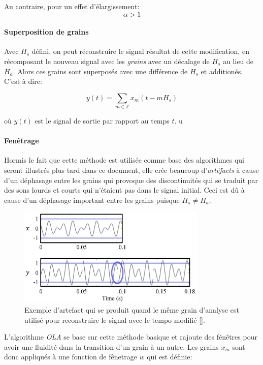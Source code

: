 \documentclass[letterpaper]{article}
\begin{document}
Au contraire, pour un effet d'élargissement:
$$\alpha > 1$$

\paragraph{Superposition de grains}

Avec $H_{s}$ défini, on peut réconstruire le signal résultat de cette modification, en récomposant
le nouveau signal avec les \emph{grains} avec un décalage de $H_{s}$ au lieu de $H_{a}$. Alors ces
grains sont superposés avec une différence de $H_{s}$ et additionés. C'est à dire:

$$ y(t) = \sum_{m \in \mathbb{Z}} x_{m}(t-mH_{s})$$

où $y(t)$ est le signal de sortie par rapport au temps $t$.
u
\paragraph {Fenêtrage}

Hormis le fait que cette méthode est utilisée comme base des algorithmes qui seront illustrés plus
tard dans ce document, elle crée beaucoup d'\emph{artéfacts} à cause d'un déphasage entre les
grains qui provoque des discontinuités qui se traduit par des sons lourds et courts qui n'étaient pas
dans le signal initial. Ceci est dû à cause d'un déphasage important entre les grains
puisque $H_{s} \neq H_{a}$.

\begin{figure}[h]
    \centerline{\includegraphics[width=9cm]{res/artifact.png}}
    \caption{\label{fig:artifact}Exemple d'artefact qui se produit quand le même grain d'analyse est
      utilisé pour reconstruire le signal avec le tempo modifié [\cite{TSMreview}]. }
  \end{figure}
  
L'algorithme \emph{OLA} se base sur cette méthode basique et rajoute des fénêtres pour avoir une
fluidité dans la transition d'un grain à un autre. Les grains $x_m$ sont donc appliqués à une fonction
de fênetrage $w$ qui est définie:
\end{document}
